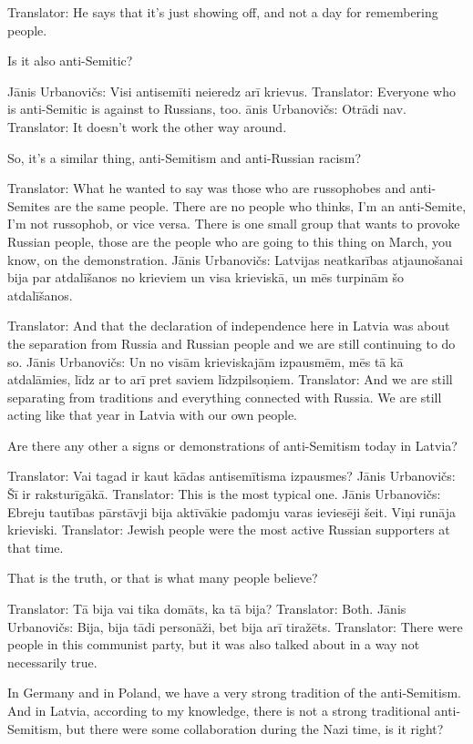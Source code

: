 Translator: He says that it’s just showing off, and not a day for remembering people. 

Is it also anti-Semitic?  

Jānis Urbanovičs: Visi antisemīti neieredz arī krievus. 
Translator: Everyone who is anti-Semitic is against to Russians, too. 
ānis Urbanovičs: Otrādi nav.  
Translator: It doesn't work the other way around.  

So, it’s a similar thing, anti-Semitism and anti-Russian racism?  

Translator: What he wanted to say was those who are russophobes and anti-Semites are the same people. There are no people who thinks, I’m an anti-Semite, I’m not russophob, or vice versa. There is one small group that wants to provoke Russian people, those are the people who are going to this thing on March, you know, on the demonstration. 
Jānis Urbanovičs: Latvijas neatkarības atjaunošanai bija par atdalīšanos no krieviem un visa krieviskā, un mēs turpinām šo atdalīšanos.  

Translator: And that the declaration of independence here in Latvia was about the separation from Russia and Russian people and we are still continuing to do so. 
Jānis Urbanovičs: Un no visām krieviskajām izpausmēm, mēs tā kā atdalāmies, līdz ar to arī pret saviem līdzpilsoņiem.  
Translator: And we are still separating from traditions and everything connected with Russia. We are still acting like that year in Latvia with our own people. 

Are there any other a signs or demonstrations of anti-Semitism today in Latvia?  

Translator: Vai tagad ir kaut kādas antisemītisma izpausmes?  
Jānis Urbanovičs: Šī ir raksturīgākā.  
Translator: This is the most typical one.  
Jānis Urbanovičs: Ebreju tautības pārstāvji bija aktīvākie padomju varas ieviesēji šeit. Viņi runāja krieviski.  
Translator: Jewish people were the most active Russian supporters at that time. 

That is the truth, or that is what many people believe?  

Translator: Tā bija vai tika domāts, ka tā bija?  
Translator: Both. 
Jānis Urbanovičs: Bija, bija tādi personāži, bet bija arī tiražēts. 
Translator: There were people in this communist party, but it was also talked about in a way not necessarily true. 

In Germany and in Poland, we have a very strong tradition of the anti-Semitism. And in Latvia, according to my knowledge, there is not a strong traditional anti-Semitism, but there were some collaboration during the Nazi time, is it right? 

